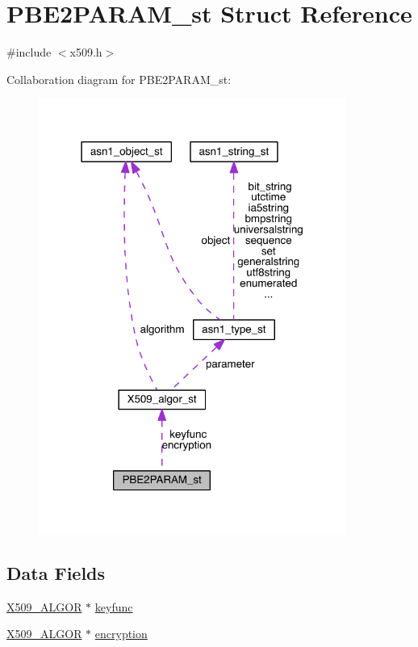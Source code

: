 \hypertarget{struct_p_b_e2_p_a_r_a_m__st}{}\section{P\+B\+E2\+P\+A\+R\+A\+M\+\_\+st Struct Reference}
\label{struct_p_b_e2_p_a_r_a_m__st}


{\ttfamily \#include $<$x509.\+h$>$}



Collaboration diagram for P\+B\+E2\+P\+A\+R\+A\+M\+\_\+st\+:\nopagebreak
\begin{figure}[H]
\begin{center}
\leavevmode
\includegraphics[width=286pt]{struct_p_b_e2_p_a_r_a_m__st__coll__graph}
\end{center}
\end{figure}
\subsection*{Data Fields}
\begin{DoxyCompactItemize}
\item 
\hyperlink{crypto_2ossl__typ_8h_aa2b6185e6254f36f709cd6577fb5022e}{X509\+\_\+\+A\+L\+G\+OR} $\ast$ \hyperlink{struct_p_b_e2_p_a_r_a_m__st_a43051d99944edfd254073c55c3655b97}{keyfunc}
\item 
\hyperlink{crypto_2ossl__typ_8h_aa2b6185e6254f36f709cd6577fb5022e}{X509\+\_\+\+A\+L\+G\+OR} $\ast$ \hyperlink{struct_p_b_e2_p_a_r_a_m__st_abf4bb6eee5b572103b0eaad7166beb3f}{encryption}
\end{DoxyCompactItemize}


